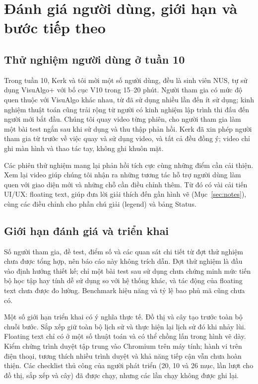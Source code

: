 \documentclass[11pt,a4paper]{article}
\begin{document}
\nextsection
\section{Đánh giá người dùng, giới hạn và bước tiếp theo}
\subsection{Thử nghiệm người dùng ở tuần 10}\label{sec:trial}
Trong tuần 10, Kerk và tôi mời một số người dùng, đều là sinh viên NUS, tự sử dụng VisuAlgo+ với bố cục V10 trong 15--20 phút. Người tham gia có mức độ quen thuộc với VisuAlgo khác nhau, từ đã sử dụng nhiều lần đến ít sử dụng; kinh nghiệm thuật toán cũng trải rộng từ người có kinh nghiệm lập trình thi đấu đến người mới bắt đầu. Chúng tôi quay video từng phiên, cho người tham gia làm một bài test ngắn sau khi sử dụng và thu thập phản hồi. Kerk đã xin phép người tham gia từ trước về việc quay và sử dụng video, và tất cả đều đồng ý; video chỉ ghi màn hình và thao tác tay, không ghi khuôn mặt.

Các phiên thử nghiệm mang lại phản hồi tích cực cùng những điểm cần cải thiện. Xem lại video giúp chúng tôi nhận ra những tương tác hỗ trợ người dùng làm quen với giao diện mới và những chỗ cần điều chỉnh thêm. Từ đó có vài cải tiến UI/UX: floating text, giúp đưa lời giải thích đến gần hình vẽ (Mục~\ref{sec:notes}), cùng các điều chỉnh cho phần chú giải (legend) và bảng Status.

\subsection{Giới hạn đánh giá và triển khai}
Số người tham gia, đề test, điểm số và các quan sát chi tiết từ đợt thử nghiệm chưa được tổng hợp, nên báo cáo này không trích dẫn. Đợt thử nghiệm là đầu vào định hướng thiết kế; chỉ một bài test sau sử dụng chưa chứng minh mức tiến bộ học tập hay tính dễ sử dụng so với hệ thống khác, và tác động của floating text chưa được đo lường. Benchmark hiệu năng và tỷ lệ bao phủ mã cũng chưa có.

Một số giới hạn triển khai có ý nghĩa thực tế. Đồ thị và cây tạo trước toàn bộ chuỗi bước. Sắp xếp giữ toàn bộ lịch sử và thực hiện lại lịch sử đó khi nhảy lùi. Floating text chỉ có ở một số thuật toán và có thể chồng lấn trong hình vẽ dày. Kiểm chứng trình duyệt tập trung vào Chromium trên máy tính; hành vi trên điện thoại, tương thích nhiều trình duyệt và khả năng tiếp cận vẫn chưa hoàn thiện. Các checklist thủ công của người phát triển (20, 10 và 26 mục, lần lượt cho đồ thị, sắp xếp và cây) đã được chạy, nhưng các lần chạy không được ghi lại.
\end{document}
